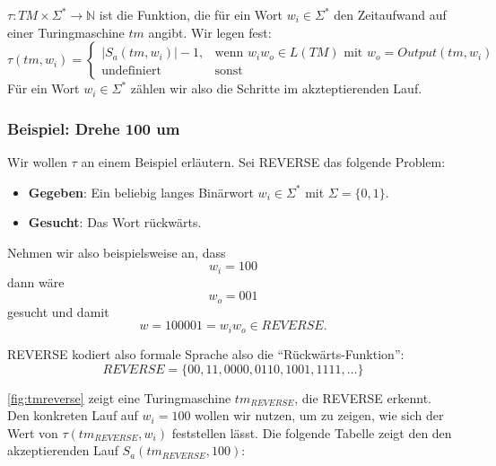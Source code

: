 $\tau: TM \times \Sigma^* \rightarrow \mathbb{N}$ ist die Funktion,
die für ein Wort $w_i \in \Sigma^*$ den Zeitaufwand auf einer Turingmaschine $tm$ angibt.
Wir legen fest:
\[
    \tau(tm, w_i) = 
        \begin{cases}
            |S_a(tm,w_i)| - 1,   & \text{wenn } w_{i}w_o \in L(TM) \text{\ mit } w_o = Output(tm, w_i)\\
            \text{undefiniert}  & \text{sonst}
        \end{cases}
\]
Für ein Wort $w_i \in \Sigma^*$ zählen wir also die Schritte im akzteptierenden Lauf.


\subsubsection{Beispiel: Drehe 100 um}

Wir wollen $\tau$ an einem Beispiel erläutern.
Sei REVERSE das folgende Problem:
\begin{itemize}
    \item \textbf{Gegeben}: Ein beliebig langes Binärwort $w_i \in \Sigma^*$ mit $\Sigma = \{0,1\}$.
    \item \textbf{Gesucht}: Das Wort rückwärts.
\end{itemize}


\noindent
Nehmen wir also beispielsweise an, dass
\[ 
    w_i = 100 
\]
dann wäre 
\[
    w_o = 001
\]
gesucht und damit
\[
    w = 100001 = w_{i}w_o \in REVERSE.
\]

\noindent
REVERSE kodiert also formale Sprache also die ``Rückwärts-Funktion'':
\[
    REVERSE = \{00, 11, 0000, 0110, 1001, 1111, \ldots\}
\]

\noindent
\autoref{fig:tmreverse} zeigt eine Turingmaschine $tm_{REVERSE}$, die REVERSE erkennt.
\\

\noindent
Den konkreten Lauf auf $w_i = 100$ wollen wir nutzen,
um zu zeigen, wie sich der Wert von $\tau(tm_{REVERSE}, w_i)$ feststellen lässt.
Die folgende Tabelle zeigt den den akzeptierenden Lauf $S_a(tm_{REVERSE}, 100)$:

